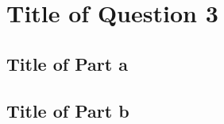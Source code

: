 \section{Title of Question 3}\label{sec:q3}

\subsection{Title of Part a}\label{sec:q3a}



\subsection{Title of Part b}\label{sec:q3b}


